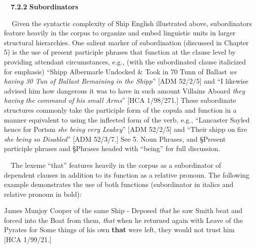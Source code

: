 \begin{styleStandard}
\ \ \textbf{7.2.2} \textbf{Subordinators}
\end{styleStandard}


\begin{styleStandard}
\textbf{\ \ }Given the syntactic complexity of Ship English illustrated above, subordinators feature heavily in the corpus to organize and embed linguistic units in larger structural hierarchies. One salient marker of subordination (discussed in Chapter 5) is the use of present participle phrases that function at the clause level by providing attendant circumstances, e.g., (with the subordinated clause italicized for emphasis) “Shipp Albermarle Undocked \& Took in 70 Tunn of Ballast \textit{we having 30 Tun of Ballast Remaining in the Shipp}” [ADM 52/2/5] and “I likewise advised him how dangerous it was to have in such amount Villains Aboard \textit{they having the command of his small Arms}” [HCA 1/98/271.] These subordinate structures commonly take the participle form of the copula and function in a manner equivalent to using the inflected form of the verb, e.g., “Lancaster Sayled hence for Portsm \textit{she being very Leakey}” [ADM 52/2/5] and “Their shipp on fire \textit{she being so Disabled}” [ADM 52/3/7.] See 5. Noun Phrases, and §Present participle phrases and §Phrases headed with “being” for full discussion.
\end{styleStandard}


\begin{styleStandard}
\ \ The lexeme “that” features heavily in the corpus as a subordinator of dependent clauses in addition to its function as a relative pronoun. The following example demonstrates the use of both functions (subordinator in italics and relative pronoun in bold):
\end{styleStandard}


\begin{styleStandard}
James Munjoy Cooper of the same Ship - Deposed \textit{that} he saw Smith beat and forced into the Boat from them, \textit{that} when he returned again with Leave of the Pyrates for Some things of his own \textbf{that} were left, they would not trust him [HCA 1/99/21.]
\end{styleStandard}


